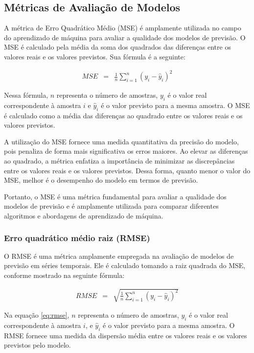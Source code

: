 \subsection{M\'etricas de Avalia\c c\~ao de Modelos}\label{subsec:metrica}


A métrica de Erro Quadrático Médio (MSE) é amplamente utilizada no campo do aprendizado de máquina para avaliar a qualidade dos modelos de previsão. O MSE é calculado pela média da soma dos quadrados das diferenças entre os valores reais e os valores previstos. Sua fórmula é a seguinte:

\begin{eqnarray}
	MSE &=& \frac{1}{n} \sum_{i=1}^{n} (y_i - \hat{y}_i)^2 \label{eq:mse}
\end{eqnarray}

Nessa fórmula, $n$ representa o número de amostras, $y_i$ é o valor real correspondente à amostra $i$ e $\hat{y}_i$ é o valor previsto para a mesma amostra. O MSE é calculado como a média das diferenças ao quadrado entre os valores reais e os valores previstos.

A utilização do MSE fornece uma medida quantitativa da precisão do modelo, pois penaliza de forma mais significativa os erros maiores. Ao elevar as diferenças ao quadrado, a métrica enfatiza a importância de minimizar as discrepâncias entre os valores reais e os valores previstos. Dessa forma, quanto menor o valor do MSE, melhor é o desempenho do modelo em termos de previsão.

Portanto, o MSE é uma métrica fundamental para avaliar a qualidade dos modelos de previsão e é amplamente utilizada para comparar diferentes algoritmos e abordagens de aprendizado de máquina.

\subsubsection{Erro quadr\'atico m\'edio raiz (RMSE)}

O RMSE é uma métrica amplamente empregada na avaliação de modelos de previsão em séries temporais. Ele é calculado tomando a raiz quadrada do MSE, conforme mostrado na seguinte fórmula:

\begin{eqnarray}
	RMSE &=& \sqrt{\frac{1}{n} \sum_{i=1}^{n} (y_i - \hat{y}_i)^2} \label{eq:rmse}
\end{eqnarray}

Na equação \eqref{eq:rmse}, $n$ representa o número de amostras, $y_i$ é o valor real correspondente à amostra $i$, e $\hat{y}_i$ é o valor previsto para a mesma amostra. O RMSE fornece uma medida da dispersão média entre os valores reais e os valores previstos pelo modelo.


